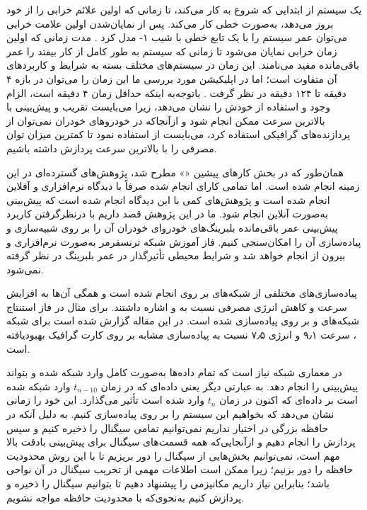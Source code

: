 
 \label{contrib}



یک سیستم از ابتدایی که شروع به کار می‌کند، تا زمانی که اولین علائم خرابی را از خود بروز می‌دهد، به‌صورت خطی کار می‌کند. پس از نمایان‌شدن اولین علامت خرابی می‌توان عمر سیستم را با یک تابع خطی با شیب ۱- مدل کرد . مدت زمانی که اولین زمان خرابی نمایان می‌شود تا زمانی که سیستم به طور کامل از کار بیفتد را عمر باقی‌مانده مفید می‌نامند. این زمان در سیستم‌های مختلف بسته به شرایط و کاربردهای آن متفاوت است؛ اما در اپلیکیشن مورد بررسی ما این زمان را می‌توان در بازه ۴ دقیقه تا ۱۲۴ دقیقه در نظر گرفت . باتوجه‌به اینکه حداقل زمان ۴ دقیقه است، الزام وجود و استفاده از  خودش را نشان می‌دهد، زیرا می‌بایست تقریب و پیش‌بینی با بالاترین سرعت ممکن انجام شود و ازآنجاکه در خودروهای خودران نمی‌توان از پردازنده‌های گرافیکی استفاده کرد، می‌بایست از  استفاده نمود تا کمترین میزان توان مصرفی را با بالاترین سرعت پردازش داشته باشیم.










همان‌طور که در بخش کار‌های پیشین «» مطرح شد، پژوهش‌های گسترده‌ای در این زمینه انجام شده است. اما تمامی کارای انجام شده صرفاً با دیدگاه نرم‌افزاری و آفلاین انجام شده است و پژوهش‌های کمی با این دیدگاه انجام شده است که پیش‌بینی به‌صورت آنلاین انجام شود. ما در این پژوهش قصد داریم با درنظرگرفتن کاربرد پیش‌بینی عمر باقی‌مانده بلبرینگ‌های خودروای خودران آن را بر روی  شبیه‌سازی و پیاده‌سازی آن را امکان‌سنجی کنیم. فاز آموزش شبکه ترنسفرمر به‌صورت نرم‌افزاری و بیرون از  انجام خواهد شد و شرایط محیطی تأثیرگذار در عمر بلبرینگ در نظر گرفته نمی‌شود. 



پیاده‌سازی‌های مختلفی از شبکه‌های  بر روی  انجام شده است و همگی آن‌ها به افزایش سرعت و کاهش انرژی مصرفی نسبت به  و  اشاره داشتند. برای مثال در  فاز استنتاج شبکه‌های  و  بر روی  پیاده‌سازی شده است. در این مقاله گزارش شده است برای شبکه ، سرعت ۹٫۱ و انرژی ۷٫۵ نسبت به پیاده‌سازی مشابه بر روی کارت گرافیک  بهبودیافته است.




در معماری شبکه  نیاز است که تمام داده‌ها به‌صورت کامل وارد شبکه شده و بتواند پیش‌بینی  را انجام دهد. به عبارتی دیگر یعنی داده‌ای که در زمان $t_{n-10}$ وارد شبکه شده است بر داده‌ای که اکنون در زمان $t_n$ وارد شده است تأثیر می‌گذارد. این خود را زمانی نشان می‌دهد که بخواهیم این سیستم را بر روی  پیاده‌سازی کنیم. به دلیل آنکه در  حافظه بزرگی در اختیار نداریم نمی‌توانیم تمامی سیگنال را ذخیره کنیم و سپس پردازش را انجام دهیم و ازآنجایی‌که همه قسمت‌های سیگنال برای پیش‌بینی  بادقت بالا مهم است، نمی‌توانیم بخش‌هایی از سیگنال را دور بریزیم تا با این روش محدودیت حافظه را دور بزنیم؛ زیرا ممکن است اطلاعات مهمی از تخریب سیگنال در آن نواحی باشد؛ بنابراین نیاز داریم مکانیزمی را پیشنهاد دهیم تا بتوانیم سیگنال را ذخیره و پردازش کنیم به‌نحوی‌که با محدودیت حافظه مواجه نشویم.




